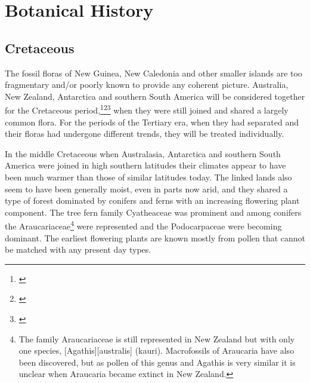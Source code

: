 \section{Botanical History}

\subsection{Cretaceous}

The fossil floras of New Guinea, New Caledonia and other smaller islands are too fragmentary and/or poorly known to provide any coherent picture.
Australia, New Zealand, Antarctica and southern South America will be considered together for the Cretaceous period,\footnote{\cite{mildenhall1980new}}\footnote{\cite{wace1965vascular}}\footnote{\cite{dettmann1981cretaceous}} when they were still joined and shared a largely common flora.
For the periods of the Tertiary era, when they had separated and their floras had undergone different trends, they will be treated individually.

In the middle Cretaceous when Australasia, Antarctica and southern South America were joined in high southern latitudes their climates appear to have been much warmer than those of similar latitudes today.
The linked lands also seem to have been generally moist, even in parts now arid, and they shared a type of forest dominated by conifers and ferns with an increasing flowering plant component.
The tree fern family Cyatheaceae was prominent and among conifers the Araucariaceae\footnote{The family Araucariaceae is still represented in New Zealand but with only one species, [Agathis][australis] (kauri). Macrofossils of Araucaria have also been discovered, but as pollen of this genus and Agathis is very similar it is unclear when Araucaria became extinct in New Zealand.} were represented and the Podocarpaceae were becoming dominant.
The earliest flowering plants are known mostly from pollen that cannot be matched with any present day types.

